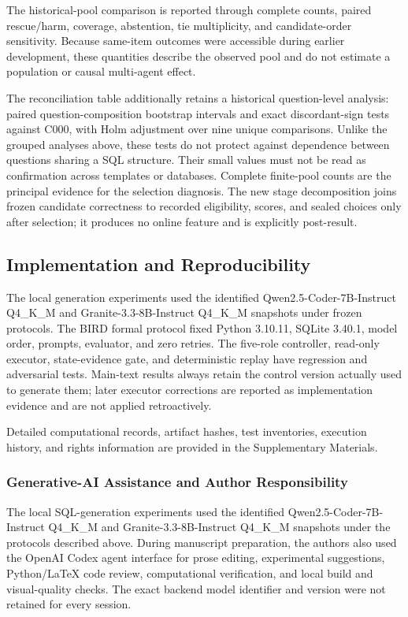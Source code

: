 \documentclass[information,article,submit,moreauthors]{Definitions/mdpi}
\begin{document}
The historical-pool comparison is reported through complete counts, paired rescue/harm, coverage, abstention, tie multiplicity, and candidate-order sensitivity. Because same-item outcomes were accessible during earlier development, these quantities describe the observed pool and do not estimate a population or causal multi-agent effect.

The reconciliation table additionally retains a historical question-level analysis: paired question-composition bootstrap intervals and exact discordant-sign tests against C000, with Holm adjustment over nine unique comparisons. Unlike the grouped analyses above, these tests do not protect against dependence between questions sharing a SQL structure. Their small values must not be read as confirmation across templates or databases. Complete finite-pool counts are the principal evidence for the selection diagnosis. The new stage decomposition joins frozen candidate correctness to recorded eligibility, scores, and sealed choices only after selection; it produces no online feature and is explicitly post-result.

\subsection{Implementation and Reproducibility}

The local generation experiments used the identified Qwen2.5-Coder-7B-Instruct Q4\_K\_M and Granite-3.3-8B-Instruct Q4\_K\_M snapshots under frozen protocols. The BIRD formal protocol fixed Python 3.10.11, SQLite 3.40.1, model order, prompts, evaluator, and zero retries. The five-role controller, read-only executor, state-evidence gate, and deterministic replay have regression and adversarial tests. Main-text results always retain the control version actually used to generate them; later executor corrections are reported as implementation evidence and are not applied retroactively.

Detailed computational records, artifact hashes, test inventories, execution history, and rights information are provided in the Supplementary Materials.

\subsubsection{Generative-AI Assistance and Author Responsibility}

The local SQL-generation experiments used the identified Qwen2.5-Coder-7B-Instruct Q4\_K\_M and Granite-3.3-8B-Instruct Q4\_K\_M snapshots under the protocols described above. During manuscript preparation, the authors also used the OpenAI Codex agent interface for prose editing, experimental suggestions, Python/\LaTeX{} code review, computational verification, and local build and visual-quality checks. The exact backend model identifier and version were not retained for every session.
\end{document}
